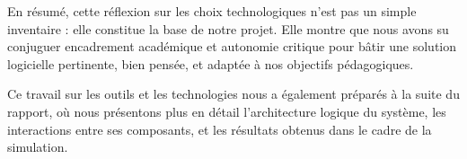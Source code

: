 En résumé, cette réflexion sur les choix technologiques n’est pas un simple inventaire : elle constitue la base de notre projet. Elle montre que nous avons su conjuguer encadrement académique et autonomie critique pour bâtir une solution logicielle pertinente, bien pensée, et adaptée à nos objectifs pédagogiques.

Ce travail sur les outils et les technologies nous a également préparés à la suite du rapport, où nous présentons plus en détail l’architecture logique du système, les interactions entre ses composants, et les résultats obtenus dans le cadre de la simulation.

